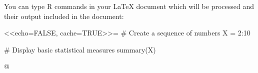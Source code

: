 \documentclass{article}
\begin{document}
You can type R commands in your \LaTeX{} document which will be processed and their output included in the document:

<<echo=FALSE, cache=TRUE>>=
# Create a sequence of numbers
X = 2:10

# Display basic statistical measures
summary(X)

@
\end{document}
